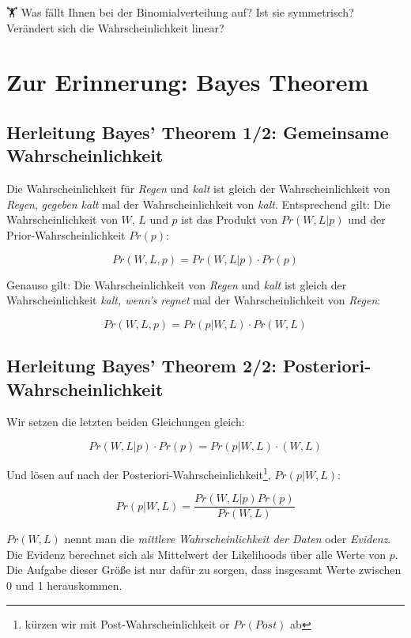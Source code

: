 \documentclass[
  a4paper,
  DIV=11]{scrreprt}
\theoremstyle{definition}
\theoremstyle{remark}
\begin{document}
🏋️️ Was fällt Ihnen bei der Binomialverteilung auf? Ist sie symmetrisch?
Verändert sich die Wahrscheinlichkeit linear?

\hypertarget{zur-erinnerung-bayes-theorem}{%
\section{Zur Erinnerung: Bayes
Theorem}\label{zur-erinnerung-bayes-theorem}}

\hypertarget{herleitung-bayes-theorem-12-gemeinsame-wahrscheinlichkeit}{%
\subsection{Herleitung Bayes' Theorem 1/2: Gemeinsame
Wahrscheinlichkeit}\label{herleitung-bayes-theorem-12-gemeinsame-wahrscheinlichkeit}}

Die Wahrscheinlichkeit für \emph{Regen} und \emph{kalt} ist gleich der
Wahrscheinlichkeit von \emph{Regen}, \emph{gegeben kalt} mal der
Wahrscheinlichkeit von \emph{kalt}. Entsprechend gilt: Die
Wahrscheinlichkeit von \(W\), \(L\) und \(p\) ist das Produkt von
\(Pr(W,L|p)\) und der Prior-Wahrscheinlichkeit \(Pr(p)\):

\[Pr(W,L,p) = Pr(W,L|p) \cdot Pr(p)\]

Genauso gilt: Die Wahrscheinlichkeit von \emph{Regen} und \emph{kalt}
ist gleich der Wahrscheinlichkeit \emph{kalt, wenn's regnet} mal der
Wahrscheinlichkeit von \emph{Regen}:

\[Pr(W,L,p) = Pr(p|W,L) \cdot Pr(W, L)\]

\hypertarget{herleitung-bayes-theorem-22-posteriori-wahrscheinlichkeit}{%
\subsection{Herleitung Bayes' Theorem 2/2:
Posteriori-Wahrscheinlichkeit}\label{herleitung-bayes-theorem-22-posteriori-wahrscheinlichkeit}}

Wir setzen die letzten beiden Gleichungen gleich:

\[Pr(W,L|p) \cdot Pr(p) = Pr(p|W,L) \cdot (W,L)\]

Und lösen auf nach der Posteriori-Wahrscheinlichkeit\footnote{kürzen wir
  mit Post-Wahrscheinlichkeit or \(Pr(Post)\) ab}, \(Pr(p|W,L)\):

\[Pr(p|W,L) = \frac{Pr(W,L|p) Pr(p)}{Pr(W,L)}\]

\(Pr(W,L)\) nennt man die \emph{mittlere Wahrscheinlichkeit der Daten}
oder \emph{Evidenz}. Die Evidenz berechnet sich als Mittelwert der
Likelihoods über alle Werte von \(p\). Die Aufgabe dieser Größe ist nur
dafür zu sorgen, dass insgesamt Werte zwischen 0 und 1 herauskommen.
\end{document}
